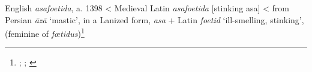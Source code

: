 \begin{etymology}\label{ety:asafoetida}
English \textit{asafoetida}, a. 1398
< Medieval Latin \textit{asafoetida} [stinking asa]
< from Persian \textit{āzā} `mastic', in a Lanized form, \textit{asa}
 + Latin \textit{foetid} `ill-smelling, stinking', (feminine of \textit{fœtidus})\footnote{\textcite[asafoetida]{oed}; \textcite[353]{laufer_sino-iranica_1919}; \textcite[42]{steingass_comprehensive_1892}}
\end{etymology}